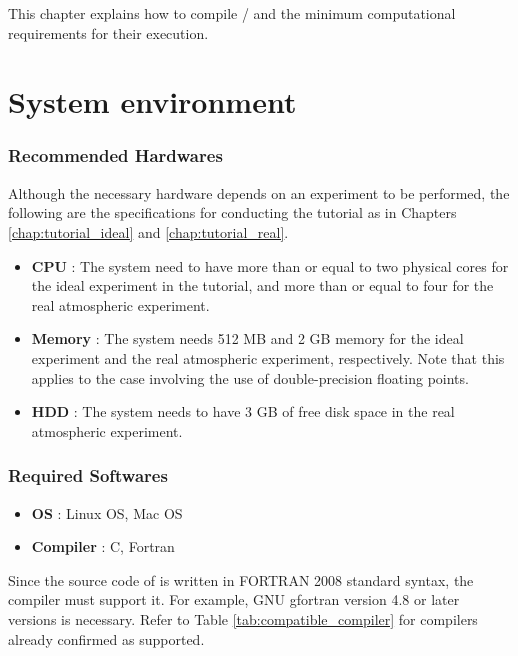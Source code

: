 This chapter explains how to compile \scalelib / \scalerm
and the minimum computational requirements for their execution.

\section{System environment} \label{sec:req_env}
\subsubsection{Recommended Hardwares}

  Although the necessary hardware depends on an experiment to be performed,
the following are the specifications for conducting the tutorial as in Chapters \ref{chap:tutorial_ideal} and \ref{chap:tutorial_real}.

  \begin{itemize}
    \item {\bf CPU} :
    The system need to have more than or equal to two physical cores for the ideal experiment in the tutorial, and more than or equal to four for the real atmospheric experiment.
    \item {\bf Memory} :
    The system needs 512 MB and 2 GB memory
    for the ideal experiment and the real atmospheric experiment, respectively.
    Note that this applies to the case involving the use of double-precision floating points.
    \item {\bf HDD} : The system needs to have 3 GB of free disk space in the real atmospheric experiment.
  \end{itemize}


\subsubsection{Required Softwares}

  \begin{itemize}
  \item {\bf OS} : Linux OS, Mac OS
  \item {\bf Compiler} : C, Fortran
  \end{itemize}

Since the source code of \scalelib is  written in FORTRAN 2008 standard syntax, the compiler must support it.
For example, GNU gfortran version 4.8 or later versions is necessary.
Refer to Table \ref{tab:compatible_compiler} for compilers already confirmed as supported.


